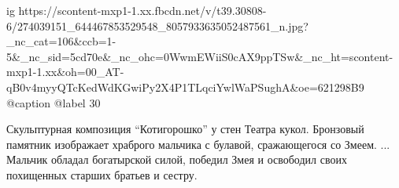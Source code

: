  
 
 
 
 

\ifcmt
  ig https://scontent-mxp1-1.xx.fbcdn.net/v/t39.30808-6/274039151_644467853529548_8057933635052487561_n.jpg?_nc_cat=106&ccb=1-5&_nc_sid=5cd70e&_nc_ohc=0WwmEWiiS0cAX9ppTSw&_nc_ht=scontent-mxp1-1.xx&oh=00_AT-qB0v4myyQTcKedWdKGwiPy2X4P1TLqciYwlWaPSughA&oe=621298B9
  @caption @label 30
\fi


Скульптурная композиция \enquote{Котигорошко} у стен Театра кукол. Бронзовый памятник
изображает храброго мальчика с булавой, сражающегося со Змеем. ... Мальчик
обладал богатырской силой, победил Змея и освободил своих похищенных старших
братьев и сестру.
